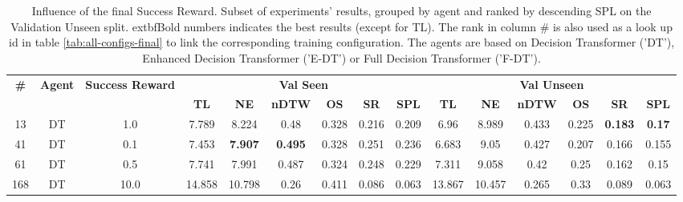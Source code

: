 \begin{table}
\centering
\caption{\label{tab:reward_scale}Influence of the final Success Reward. Subset of experiments' results, grouped by agent and ranked by descending SPL on the Validation Unseen split. 	extbf{Bold} numbers indicates the best results (except for TL). The rank in column \# is also used as a look up id in table \ref{tab:all-configs-final} to link the corresponding training configuration.     \newline The agents are based on Decision Transformer ('DT'), Enhanced Decision Transformer ('E-DT') or Full Decision Transformer ('F-DT').}
\begin{tabular}{@{\hskip3pt}c@{\hskip3pt}c@{\hskip3pt}c@{\hskip3pt}c@{\hskip3pt}c@{\hskip3pt}c@{\hskip3pt}c@{\hskip3pt}c@{\hskip3pt}c@{\hskip3pt}c@{\hskip3pt}c@{\hskip3pt}c@{\hskip3pt}c@{\hskip3pt}c@{\hskip3pt}c}
\toprule
\textbf{\#} & \textbf{Agent} & \textbf{Success Reward } & \multicolumn{6}{c}{\textbf{Val Seen}} & \multicolumn{6}{c}{\textbf{Val Unseen}} \\
 \textbf{~} &     \textbf{~} &               \textbf{~} &       \textbf{TL} &     \textbf{NE} &   \textbf{nDTW} &     \textbf{OS} &     \textbf{SR} &    \textbf{SPL} &         \textbf{TL} &   \textbf{NE} &   \textbf{nDTW} &     \textbf{OS} &     \textbf{SR} &   \textbf{SPL} \\
\midrule
         13 &             DT &                      1.0 &             7.789 &           8.224 &            0.48 &           0.328 &           0.216 &           0.209 &                6.96 &         8.989 &           0.433 &           0.225 &  \textbf{0.183} &  \textbf{0.17} \\
         41 &             DT &                      0.1 &             7.453 &  \textbf{7.907} &  \textbf{0.495} &           0.328 &           0.251 &           0.236 &               6.683 &          9.05 &           0.427 &           0.207 &           0.166 &          0.155 \\
         61 &             DT &                      0.5 &             7.741 &           7.991 &           0.487 &           0.324 &           0.248 &           0.229 &               7.311 &         9.058 &            0.42 &            0.25 &           0.162 &           0.15 \\
        168 &             DT &                     10.0 &            14.858 &          10.798 &            0.26 &           0.411 &           0.086 &           0.063 &              13.867 &        10.457 &           0.265 &            0.33 &           0.089 &          0.063 \\

\end{tabular}
\end{table}
